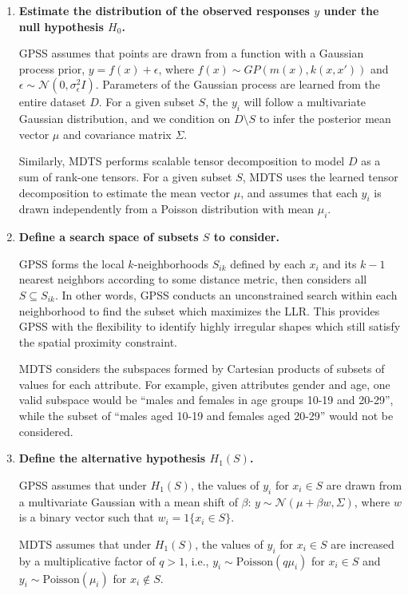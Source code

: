 \documentclass{acm_proc_article-sp}
\begin{document}
\begin{enumerate}
    \item \textbf{Estimate the distribution of the observed responses $y$ under the null hypothesis $H_0$.}
    
    \noindent GPSS assumes that points are drawn from a function with a Gaussian process prior, $y = f(x) + \epsilon$, where $f(x) \sim GP(m(x), k(x,x'))$ and $\epsilon \sim \mathcal{N}(0,\sigma_\epsilon^2 I)$.  Parameters of the Gaussian process are learned from the entire dataset $D$. For a given subset $S$, the $y_i$ will follow a multivariate Gaussian distribution, and we condition on $D \setminus S$ to infer the posterior mean vector $\mu$ and covariance matrix $\Sigma$.
    
    Similarly, MDTS performs scalable tensor decomposition to model $D$ as a sum of rank-one tensors. For a given subset $S$, MDTS uses the learned tensor decomposition to estimate the mean vector $\mu$, and assumes that each $y_i$ is drawn independently from a Poisson distribution with mean $\mu_i$.
    \item \textbf{Define a search space of subsets $S$ to consider.}  
    
    GPSS forms the local $k$-neighborhoods $S_{ik}$ defined by each $x_i$ and its $k-1$ nearest neighbors according to some distance metric, then considers all $S \subseteq S_{ik}$.  In other words, GPSS conducts an unconstrained search within each neighborhood to find the subset which maximizes the LLR. This provides GPSS with the flexibility to identify highly irregular shapes which still satisfy the spatial proximity constraint.
    
    MDTS considers the subspaces formed by Cartesian products of subsets of values for each attribute.  For example, given attributes gender and age, one valid subspace would be ``males and females in age groups 10-19 and 20-29'', while the subset of ``males aged 10-19 and females aged 20-29'' would not be considered.
    
    \item \textbf{Define the alternative hypothesis $H_1(S)$.}  
    
    GPSS assumes that under $H_1(S)$, the values of $y_i$ for $x_i \in S$ are drawn from a multivariate Gaussian with a mean shift of $\beta$: $y \sim \mathcal{N}(\mu + \beta w, \Sigma)$, where $w$ is a binary vector such that $w_i = 1\{x_i \in S\}$.  
    
    MDTS assumes that under $H_1(S)$, the values of $y_i$ for $x_i \in S$ are increased by a multiplicative factor of $q > 1$, i.e., $y_i \sim \mbox{Poisson}(q\mu_i)$ for $x_i \in S$ and $y_i \sim \mbox{Poisson}(\mu_i)$ for $x_i \not\in S$.
    

\end{enumerate}
\end{document}
